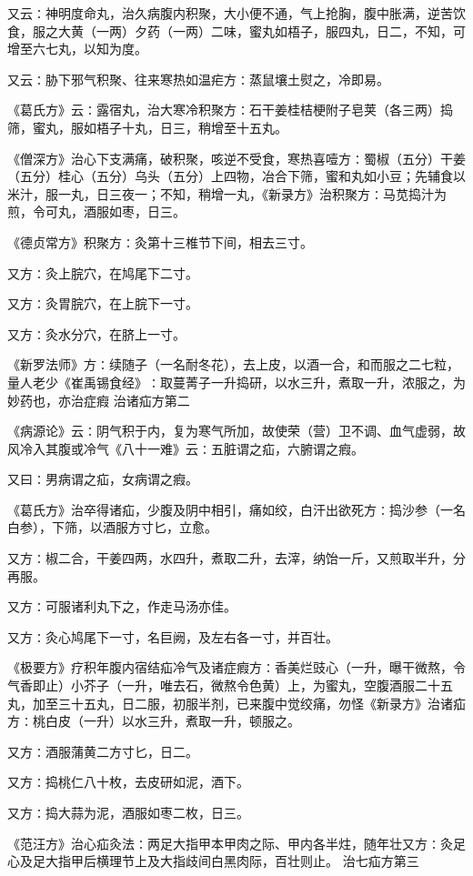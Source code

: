 \documentclass[a4paper,12pt,UTF8,twoside]{ctexbook}
\begin{document}
又云∶神明度命丸，治久病腹内积聚，大小便不通，气上抢胸，腹中胀满，逆苦饮食，服之大黄（一两）夕药（一两）二味，蜜丸如梧子，服四丸，日二，不知，可增至六七丸，以知为度。

又云∶胁下邪气积聚、往来寒热如温疟方∶蒸鼠壤土熨之，冷即易。

《葛氏方》云∶露宿丸，治大寒冷积聚方∶石干姜桂桔梗附子皂荚（各三两）捣筛，蜜丸，服如梧子十丸，日三，稍增至十五丸。

《僧深方》治心下支满痛，破积聚，咳逆不受食，寒热喜噎方∶蜀椒（五分）干姜（五分）桂心（五分）乌头（五分）上四物，冶合下筛，蜜和丸如小豆；先辅食以米汁，服一丸，日三夜一；不知，稍增一丸，《新录方》治积聚方∶马苋捣汁为煎，令可丸，酒服如枣，日三。

《德贞常方》积聚方∶灸第十三椎节下间，相去三寸。

又方∶灸上脘穴，在鸠尾下二寸。

又方∶灸胃脘穴，在上脘下一寸。

又方∶灸水分穴，在脐上一寸。

《新罗法师》方∶续随子（一名耐冬花），去上皮，以酒一合，和而服之二七粒，量人老少《崔禹锡食经》∶取蔓菁子一升捣研，以水三升，煮取一升，浓服之，为妙药也，亦治症瘕
治诸疝方第二

《病源论》云∶阴气积于内，复为寒气所加，故使荣（营）卫不调、血气虚弱，故风冷入其腹或冷气《八十一难》云∶五脏谓之疝，六腑谓之瘕。

又曰∶男病谓之疝，女病谓之瘕。

《葛氏方》治卒得诸疝，少腹及阴中相引，痛如绞，白汗出欲死方∶捣沙参（一名白参），下筛，以酒服方寸匕，立愈。

又方∶椒二合，干姜四两，水四升，煮取二升，去滓，纳饴一斤，又煎取半升，分再服。

又方∶可服诸利丸下之，作走马汤亦佳。

又方∶灸心鸠尾下一寸，名巨阙，及左右各一寸，并百壮。

《极要方》疗积年腹内宿结疝冷气及诸症瘕方∶香美烂豉心（一升，曝干微熬，令气香即止）小芥子（一升，唯去石，微熬令色黄）上，为蜜丸，空腹酒服二十五丸，加至三十五丸，日二服，初服半剂，已来腹中觉绞痛，勿怪《新录方》治诸疝方∶桃白皮（一升）以水三升，煮取一升，顿服之。

又方∶酒服蒲黄二方寸匕，日二。

又方∶捣桃仁八十枚，去皮研如泥，酒下。

又方∶捣大蒜为泥，酒服如枣二枚，日三。

《范汪方》治心疝灸法∶两足大指甲本甲肉之际、甲内各半炷，随年壮又方∶灸足心及足大指甲后横理节上及大指歧间白黑肉际，百壮则止。
治七疝方第三
\end{document}

